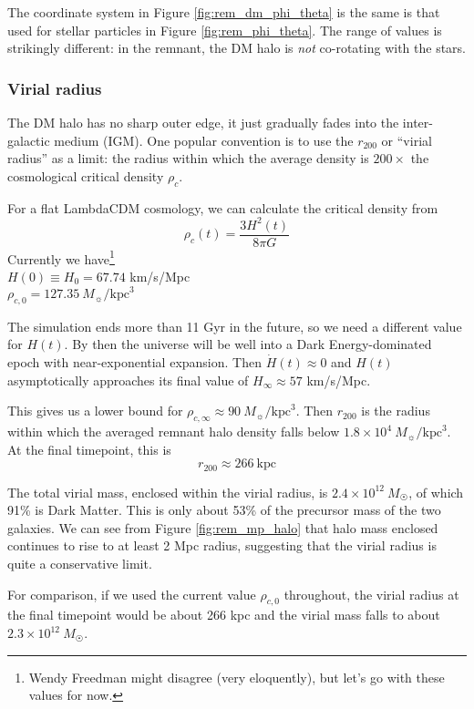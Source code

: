 \documentclass[twocolumn]{aastex63}
\newcommand{\todo}{\color{red}{TODO}\color{black}\hspace{2mm}}
\begin{document}
The coordinate system in Figure \ref{fig:rem_dm_phi_theta} is the same is that used for stellar particles in Figure \ref{fig:rem_phi_theta}. The range of values is strikingly different: in the remnant, the DM halo is \textit{not} co-rotating with the stars.
	
\todo{DM density, shape, ellipse fitting}	

\subsubsection{Virial radius}

The DM halo has no sharp outer edge, it just gradually fades into the inter-galactic medium (IGM). One popular convention is to use the $r_{200}$ or ``virial radius'' as a limit: the radius within which the average density is $200\times$ the cosmological critical density $\rho_c$.

For a flat LambdaCDM cosmology, we can calculate the critical density from
\[ \rho_c(t) = \frac{3 H^2(t)}{8 \pi G} \] 
Currently \citep{planck_collaboration_planck_2016} we have\footnote{Wendy Freedman might disagree (very eloquently), but let's go with these values for now.} \\
$H(0) \equiv H_0 = 67.74$ km/s/Mpc \\
$\rho_{c,0} = 127.35\ M_\sun/\text{kpc}^3$

The simulation ends more than 11 Gyr in the future, so we need a different value for $H(t)$. By then the universe will be well into a Dark Energy-dominated epoch with near-exponential expansion. Then $\dot{H}(t) \approx 0$ and $H(t)$ asymptotically approaches its final value of $H_{\infty} \approx 57$ km/s/Mpc.

This gives us a lower bound for $\rho_{c,\infty} \approx 90\ M_\sun/\text{kpc}^3$. Then $r_{200}$ is the radius within which the averaged remnant halo density falls below $1.8 \times 10^4\ M_\sun/\text{kpc}^3$. At the final timepoint, this is 
\[ r_{200} \approx 266\ \text{kpc} \]

The total virial mass, enclosed within the virial radius, is $2.4 \times 10^{12}\ M_\Sun$, of which 91\% is Dark Matter. This is only about 53\% of the precursor mass of the two galaxies. We can see from Figure \ref{fig:rem_mp_halo} that halo mass enclosed continues to rise to at least 2 Mpc radius, suggesting that the virial radius is quite a conservative limit.

For comparison, if we used the current value $\rho_{c,0}$ throughout, the virial radius at the final timepoint would be about 266 kpc and the virial mass falls to about $2.3 \times 10^{12}\ M_\Sun$. 
\end{document}
